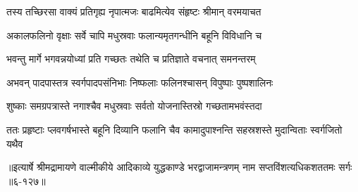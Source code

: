 \twolineshloka
{तस्य तच्छिरसा वाक्यं प्रतिगृह्य नृपात्मजः}
{बाढमित्येव संहृष्टः श्रीमान् वरमयाचत} %

\twolineshloka
{अकालफलिनो वृक्षाः सर्वे चापि मधुस्रवाः}
{फलान्यमृतगन्धीनि बहूनि विविधानि च} %

\twolineshloka
{भवन्तु मार्गे भगवन्नयोध्यां प्रति गच्छतः}
{तथेति च प्रतिज्ञाते वचनात् समनन्तरम्} %

\twolineshloka
{अभवन् पादपास्तत्र स्वर्गपादपसंनिभाः}
{निष्फलाः फलिनश्चासन् विपुष्पाः पुष्पशालिनः} %

\twolineshloka
{शुष्काः समग्रपत्रास्ते नगाश्चैव मधुस्रवाः}
{सर्वतो योजनास्तिस्रो गच्छतामभवंस्तदा} %

\twolineshloka
{ततः प्रहृष्टाः प्लवगर्षभास्ते बहूनि दिव्यानि फलानि चैव}
{कामादुपाश्नन्ति सहस्रशस्ते मुदान्विताः स्वर्गजितो यथैव} %


॥इत्यार्षे श्रीमद्रामायणे वाल्मीकीये आदिकाव्ये युद्धकाण्डे भरद्वाजामन्त्रणम् नाम सप्तविंशत्यधिकशततमः सर्गः ॥६-१२७॥
